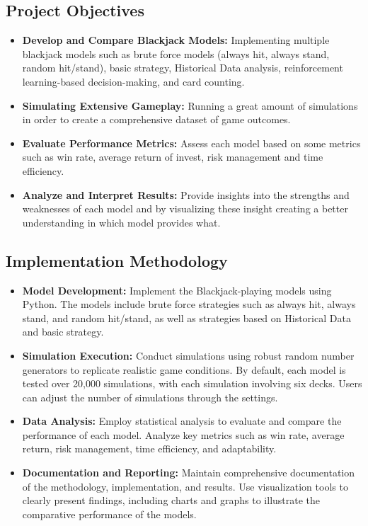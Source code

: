\documentclass[a4paper,12pt]{report}
\begin{document}
\subsection{Project Objectives}
\begin{itemize}
\item \textbf{Develop and Compare Blackjack Models:} Implementing multiple blackjack models such as brute force models (always hit, always stand, random hit/stand), basic strategy, Historical Data analysis, reinforcement learning-based decision-making, and card counting.
\item \textbf{Simulating Extensive Gameplay:} Running a great amount of simulations in order to create a comprehensive dataset of game outcomes.
\item \textbf{Evaluate Performance Metrics:} Assess each model based on some metrics such as win rate, average return of invest, risk management and time efficiency.
\item \textbf{Analyze and Interpret Results:} Provide insights into the strengths and weaknesses of each model and by visualizing these insight creating a better understanding in which model provides what.
\end{itemize}
\subsection{Implementation Methodology}
\begin{itemize}
\item \textbf{Model Development:} Implement the Blackjack-playing models using Python. The models include brute force strategies such as always hit, always stand, and random hit/stand, as well as strategies based on Historical Data and basic strategy.
\item \textbf{Simulation Execution:} Conduct simulations using robust random number generators to replicate realistic game conditions. By default, each model is tested over 20,000 simulations, with each simulation involving six decks. Users can adjust the number of simulations through the settings.
\item \textbf{Data Analysis:} Employ statistical analysis to evaluate and compare the performance of each model. Analyze key metrics such as win rate, average return, risk management, time efficiency, and adaptability.
\item \textbf{Documentation and Reporting:} Maintain comprehensive documentation of the methodology, implementation, and results. Use visualization tools to clearly present findings, including charts and graphs to illustrate the comparative performance of the models.
\end{itemize}
\end{document}
